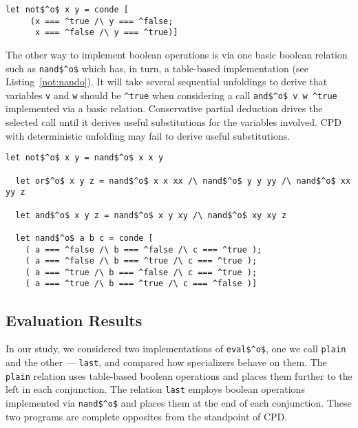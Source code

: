 \begin{figure*}[!h]
  \centering
  \begin{minipage}{0.45\textwidth}
    \begin{lstlisting}[label={not:table}, caption={Implementation of boolean \lstinline{not} as a table}, captionpos=b, frame=tb]
  let not$^o$ x y = conde [
     (x === ^true /\ y === ^false;
      x === ^false /\ y === ^true)]
    \end{lstlisting}
  \end{minipage}
\end{figure*}

The other way to implement boolean operations is via one basic boolean relation such as \lstinline{nand$^o$} which has, in turn, a table-based implementation (see Listing~\ref{not:nando}).
It will take several sequential unfoldings to derive that variables \lstinline{v} and \lstinline{w} should be \lstinline{^true} when considering a call \lstinline{and$^o$ v w ^true} implemented via a basic relation.
Conservative partial deduction drives the selected call until it derives useful substitutions for the variables involved.
CPD with deterministic unfolding may fail to derive useful substitutions.

\begin{figure*}[!h]
  \centering
  \begin{minipage}{0.7\textwidth}
    \begin{lstlisting}[label={not:nando}, caption={Implementation of boolean operations via \lstinline{nand}}, captionpos=b, frame=tb]
  let not$^o$ x y = nand$^o$ x x y

  let or$^o$ x y z = nand$^o$ x x xx /\ nand$^o$ y y yy /\ nand$^o$ xx yy z

  let and$^o$ x y z = nand$^o$ x y xy /\ nand$^o$ xy xy z

  let nand$^o$ a b c = conde [
    ( a === ^false /\ b === ^false /\ c === ^true );
    ( a === ^false /\ b === ^true /\ c === ^true );
    ( a === ^true /\ b === ^false /\ c === ^true );
    ( a === ^true /\ b === ^true /\ c === ^false )]
    \end{lstlisting}
  \end{minipage}
\end{figure*}

\subsection{Evaluation Results}

In our study, we considered two implementations of \lstinline{eval$^o$}, one we call \lstinline{plain} and the other --- \lstinline{last}, and compared how specializers behave on them.
The \lstinline{plain} relation uses table-based boolean operations and places them further to the left in each conjunction.
The relation \lstinline{last} employs boolean operations implemented via \lstinline{nand$^o$} and places them at the end of each conjunction.
These two programs are complete opposites from the standpoint of CPD.

